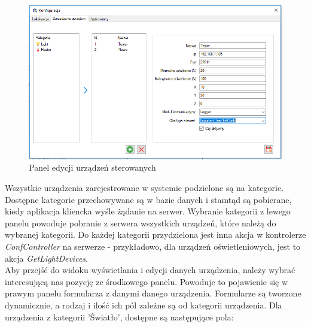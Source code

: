 \begin{figure}[H]			
	\centering
	\caption{Panel edycji urządzeń sterowanych}
	\includegraphics[width=1.0\textwidth]{panel_konf_ster}
\end{figure}
Wszystkie urządzenia zarejestrowane w systemie podzielone są na kategorie. Dostępne kategorie przechowywane są w bazie danych i stamtąd są pobierane, kiedy aplikacja kliencka wyśle żądanie na serwer. Wybranie kategorii z lewego panelu powoduje pobranie z serwera wszystkich urządzeń, które należą do wybranej kategorii. Do każdej kategorii przydzielona jest inna akcja w kontrolerze \textit{ConfController} na serwerze - przykładowo, dla urządzeń oświetleniowych, jest to akcja \textit{GetLightDevices}.\\
Aby przejść do widoku wyświetlania i edycji danych urządzenia, należy wybrać interesującą nas pozycję ze środkowego panelu. Powoduje to pojawienie się w prawym panelu formularza z danymi danego urządzenia. Formularze są tworzone dynamicznie, a rodzaj i ilość ich pól zależne są od kategorii urządzenia. Dla urządzenia z kategorii 'Światło', dostępne są następujące pola:
